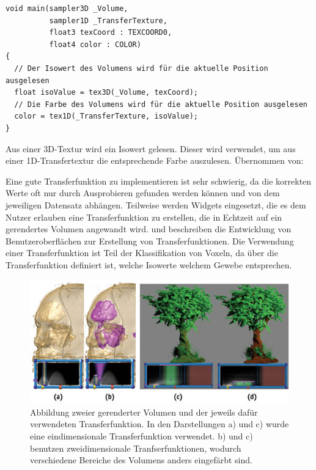 \begin{listing}[!htb]
\begin{verbatim}
void main(sampler3D _Volume,
          sampler1D _TransferTexture,
          float3 texCoord : TEXCOORD0,
          float4 color : COLOR)
{
  // Der Isowert des Volumens wird für die aktuelle Position ausgelesen
  float isoValue = tex3D(_Volume, texCoord);
  // Die Farbe des Volumens wird für die aktuelle Position ausgelesen
  color = tex1D(_TransferTexture, isoValue);
}
\end{verbatim}
\caption{Aus einer 3D-Textur wird ein Isowert gelesen. Dieser wird verwendet, um aus einer 1D-Transfertextur die entsprechende Farbe auszulesen. Übernommen von: \cite{Fernando04}}
\label{lst:transfer}
\end{listing}
\FloatBarrier

Eine gute Transferfunktion zu implementieren ist sehr schwierig, da die korrekten Werte oft nur durch Ausprobieren gefunden werden können und von dem jeweiligen Datensatz abhängen. Teilweise werden Widgets eingesetzt, die es dem Nutzer erlauben eine Transferfunktion zu erstellen, die in Echtzeit auf ein gerendertes Volumen angewandt wird.
\cite{salama06} und \cite{Knig99} beschreiben die Entwicklung von Benutzeroberflächen zur Erstellung von Transferfunktionen.
Die Verwendung einer Transferfunktion ist Teil der Klassifikation von Voxeln, da über die Transferfunktion definiert ist, welche Isowerte welchem Gewebe entsprechen.

\begin{figure}[!htb]
	\centering
	\includegraphics[width=0.7\linewidth]{images/transferfunction.jpg}
	\caption{Abbildung zweier gerenderter Volumen und der jeweils dafür verwendeten Transferfunktion. In den Darstellungen a) und c) wurde eine eindimensionale Transferfunktion verwendet. b) und c) benutzen zweidimensionale Tranfserfunktionen, wodurch verschiedene Bereiche des Volumens anders eingefärbt sind.}
	\label{img:transferfunction}
\end{figure}
\FloatBarrier



